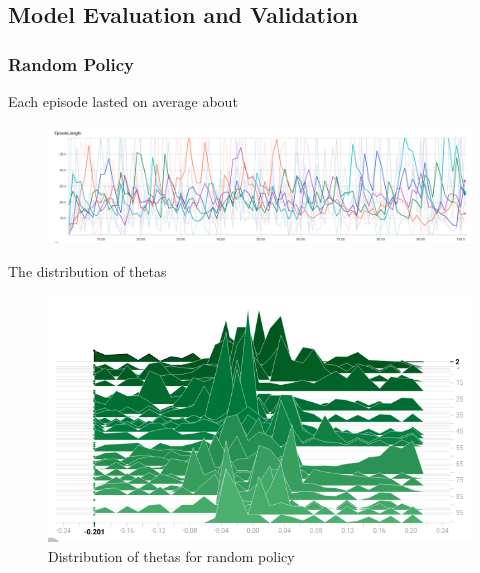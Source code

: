 \documentclass[12pt,a4paper]{article}
\begin{document}
\subsection*{Model Evaluation and Validation}

\subsubsection*{Random Policy}
Each episode lasted on average about 
\begin{figure}[htbp]
\begin{center}
\includegraphics[width=\linewidth]{rand_ep_length.png}
\caption[]{}
\label{rand_ep_length}
\end{center}
\end{figure}
 The distribution of thetas 

\begin{figure}[htbp]
\begin{center}
\includegraphics[width=\linewidth]{rand_thetas.png}
\caption{Distribution of thetas for random policy}
\label{rand_ep_length}
\end{center}
\end{figure}
\end{document}
